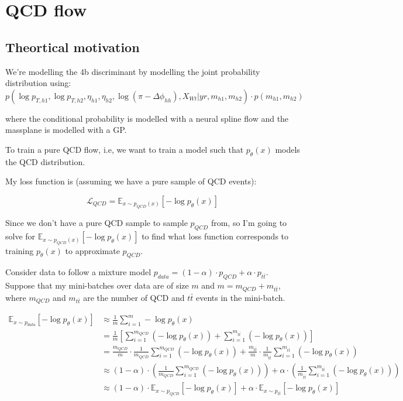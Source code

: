 \section{QCD flow}
\label{sec:qcd-flow}

\subsection{Theortical motivation}
\label{subsec:qcd-theory}

We're modelling the 4b discriminant by modelling the joint probability distribution using:
\begin{equation}
p(  \log p_{T,h1}, \log p_{T,h2}, \eta_{h1}, \eta_{h2}, \log \left( \pi - \Delta \phi_{hh} \right)  , X_{Wt} | yr, m_{h1}, m_{h2}) \cdot p(m_{h1}, m_{h2}) 
\end{equation}

where the conditional probability is modelled with a neural spline flow and the massplane is modelled with a GP.

To train a pure QCD flow, i.e, we want to train a model such that $p_\theta (x)$ models the QCD distribution.

My loss function is (assuming we have a pure sample of QCD events):

\begin{equation}
\mathcal{L}_{QCD} = \mathbb{E}_{x \sim p_{QCD}(x)} [- \log p_{\theta} (x)] 
\end{equation}

Since we don't have a pure QCD sample to sample $p_{QCD}$ from, so I'm going to solve for $\mathbb{E}_{x \sim p_{QCD}(x)} [- \log p_{\theta} (x)]$ to find what loss function corresponds to training $p_\theta(x)$ to approximate $p_{QCD}$.

Consider data to follow a mixture model $p_{data} = (1 -\alpha)\cdot p_{QCD} + \alpha\cdot  p_{t\bar{t}}$. Suppose that my mini-batches over data are of size $m$ and $m = m_{QCD}+m_{t\bar{t}}$, where $m_{QCD}$ and $m_{t\bar{t}}$ are the number of QCD and $t\bar{t}$ events in the mini-batch.

\begin{align}
\mathbb{E}_{x \sim p_{data}} [-\log p_\theta (x)] &\approx \frac{1}{m}\sum_{i = 1}^m -\log p_\theta (x) \\
&= \frac{1}{m} \left[ \sum_{i = 1}^{m_{QCD}} \left(-\log p_\theta (x)\right) + \sum_{i = 1}^{m_{t\bar{t}}} \left(-\log p_\theta (x)\right)  \right] \\
&=  \frac{m_{QCD}}{m} \cdot \frac{1}{m_{QCD}} \sum_{i = 1}^{m_{QCD}} \left(-\log p_\theta (x)\right) + \frac{m_{t\bar{t}}}{m} \cdot \frac{1}{m_{t\bar{t}}}\sum_{i = 1}^{m_{t\bar{t}}} \left(-\log p_\theta (x)\right) \\
&\approx (1- \alpha) \cdot \left( \frac{1}{m_{QCD}} \sum_{i = 1}^{m_{QCD}} \left(-\log p_\theta (x)\right) \right) + \alpha \cdot \left( \frac{1}{m_{t\bar{t}}}\sum_{i = 1}^{m_{t\bar{t}}} \left(-\log p_\theta (x)\right) \right)\\
&\approx (1-\alpha) \cdot \mathbb{E}_{x \sim p_{QCD}} [-\log p_\theta (x)] + \alpha \cdot \mathbb{E}_{x \sim p_{t\bar{t}}} [-\log p_\theta (x)]
\end{align}


